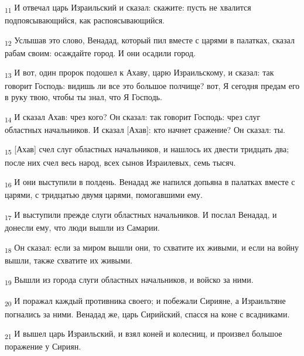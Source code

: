 \begin{tcolorbox}
\textsubscript{11} И отвечал царь Израильский и сказал: скажите: пусть не хвалится подпоясывающийся, как распоясывающийся.
\end{tcolorbox}
\begin{tcolorbox}
\textsubscript{12} Услышав это слово, Венадад, который пил вместе с царями в палатках, сказал рабам своим: осаждайте город. И они осадили город.
\end{tcolorbox}
\begin{tcolorbox}
\textsubscript{13} И вот, один пророк подошел к Ахаву, царю Израильскому, и сказал: так говорит Господь: видишь ли все это большое полчище? вот, Я сегодня предам его в руку твою, чтобы ты знал, что Я Господь.
\end{tcolorbox}
\begin{tcolorbox}
\textsubscript{14} И сказал Ахав: чрез кого? Он сказал: так говорит Господь: чрез слуг областных начальников. И сказал [Ахав]: кто начнет сражение? Он сказал: ты.
\end{tcolorbox}
\begin{tcolorbox}
\textsubscript{15} [Ахав] счел слуг областных начальников, и нашлось их двести тридцать два; после них счел весь народ, всех сынов Израилевых, семь тысяч.
\end{tcolorbox}
\begin{tcolorbox}
\textsubscript{16} И они выступили в полдень. Венадад же напился допьяна в палатках вместе с царями, с тридцатью двумя царями, помогавшими ему.
\end{tcolorbox}
\begin{tcolorbox}
\textsubscript{17} И выступили прежде слуги областных начальников. И послал Венадад, и донесли ему, что люди вышли из Самарии.
\end{tcolorbox}
\begin{tcolorbox}
\textsubscript{18} Он сказал: если за миром вышли они, то схватите их живыми, и если на войну вышли, также схватите их живыми.
\end{tcolorbox}
\begin{tcolorbox}
\textsubscript{19} Вышли из города слуги областных начальников, и войско за ними.
\end{tcolorbox}
\begin{tcolorbox}
\textsubscript{20} И поражал каждый противника своего; и побежали Сирияне, а Израильтяне погнались за ними. Венадад же, царь Сирийский, спасся на коне с всадниками.
\end{tcolorbox}
\begin{tcolorbox}
\textsubscript{21} И вышел царь Израильский, и взял коней и колесниц, и произвел большое поражение у Сириян.
\end{tcolorbox}
